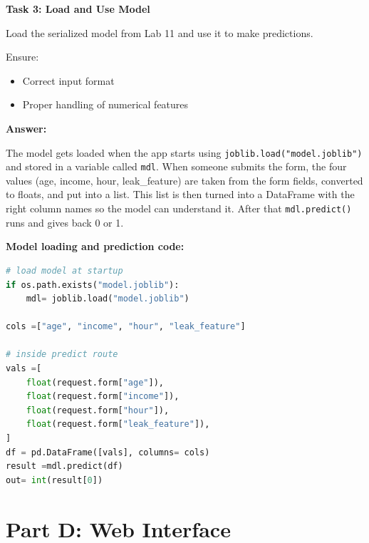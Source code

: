 \documentclass[12pt,a4paper]{article}
\begin{document}
\begin{tcolorbox}
\textbf{Task 3: Load and Use Model}

Load the serialized model from Lab 11 and use it to make predictions.

Ensure:
\begin{itemize}
\item Correct input format
\item Proper handling of numerical features
\end{itemize}

\textbf{Answer:}

The model gets loaded when the app starts using \texttt{joblib.load("model.joblib")} and stored in a variable called \texttt{mdl}. When someone submits the form, the four values (age, income, hour, leak\_feature) are taken from the form fields, converted to floats, and put into a list. This list is then turned into a DataFrame with the right column names so the model can understand it. After that \texttt{mdl.predict()} runs and gives back 0 or 1.

\textbf{Model loading and prediction code:}

\begin{lstlisting}[language=Python]
# load model at startup
if os.path.exists("model.joblib"):
    mdl= joblib.load("model.joblib")

cols =["age", "income", "hour", "leak_feature"]

# inside predict route
vals =[
    float(request.form["age"]),
    float(request.form["income"]),
    float(request.form["hour"]),
    float(request.form["leak_feature"]),
]
df = pd.DataFrame([vals], columns= cols)
result =mdl.predict(df)
out= int(result[0])
\end{lstlisting}

\end{tcolorbox}

\vspace{24pt}


\section*{Part D: Web Interface}
\end{document}
